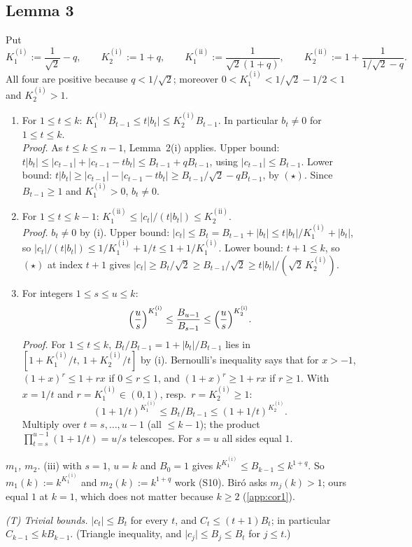 \documentclass[11pt]{amsart}
\theoremstyle{remark}
\theoremstyle{plain}
\newcommand{\abs}[1]{\lvert #1\rvert}
\newcommand{\Ka}{K_1^{(\mathrm{i})}}
\newcommand{\Kb}{K_2^{(\mathrm{i})}}
\newcommand{\Kc}{K_1^{(\mathrm{ii})}}
\newcommand{\Kd}{K_2^{(\mathrm{ii})}}
\begin{document}
\subsection{Lemma 3}\label{app:lemma3}
Put
\[
\Ka:=\frac1{\sqrt2}-q,\qquad \Kb:=1+q,\qquad \Kc:=\frac1{\sqrt2(1+q)},\qquad \Kd:=1+\frac1{1/\sqrt2-q}.
\]
All four are positive because $q<1/\sqrt2$; moreover $0<\Ka<1/\sqrt2-1/2<1$ and $\Kb>1$.

\begin{enumerate}[label=(\roman*),leftmargin=*]
\item For $1\le t\le k$: $\Ka B_{t-1}\le t\abs{b_t}\le\Kb B_{t-1}$. In particular $b_t\ne0$ for $1\le t\le k$. \\
\emph{Proof.} As $t\le k\le n-1$, Lemma~2(i) applies. Upper bound: $t\abs{b_t}\le\abs{c_{t-1}}+\abs{c_{t-1}-tb_t}\le B_{t-1}+qB_{t-1}$, using $\abs{c_{t-1}}\le B_{t-1}$. Lower bound: $t\abs{b_t}\ge\abs{c_{t-1}}-\abs{c_{t-1}-tb_t}\ge B_{t-1}/\sqrt2-qB_{t-1}$, by $(\star)$. Since $B_{t-1}\ge1$ and $\Ka>0$, $b_t\ne0$.
\item For $1\le t\le k-1$: $\Kc\le\abs{c_t}/(t\abs{b_t})\le\Kd$. \\
\emph{Proof.} $b_t\ne0$ by (i). Upper bound: $\abs{c_t}\le B_t=B_{t-1}+\abs{b_t}\le t\abs{b_t}/\Ka+\abs{b_t}$, so $\abs{c_t}/(t\abs{b_t})\le1/\Ka+1/t\le1+1/\Ka$. Lower bound: $t+1\le k$, so $(\star)$ at index $t+1$ gives $\abs{c_t}\ge B_t/\sqrt2\ge B_{t-1}/\sqrt2\ge t\abs{b_t}/(\sqrt2\,\Kb)$.
\item For integers $1\le s\le u\le k$:
\[
\Bigl(\frac us\Bigr)^{\Ka}\le\frac{B_{u-1}}{B_{s-1}}\le\Bigl(\frac us\Bigr)^{\Kb}.
\]
\emph{Proof.} For $1\le t\le k$, $B_t/B_{t-1}=1+\abs{b_t}/B_{t-1}$ lies in $[1+\Ka/t,\,1+\Kb/t]$ by (i). Bernoulli's inequality says that for $x>-1$, $(1+x)^r\le1+rx$ if $0\le r\le1$, and $(1+x)^r\ge1+rx$ if $r\ge1$. With $x=1/t$ and $r=\Ka\in(0,1)$, resp.\ $r=\Kb\ge1$:
\[
(1+1/t)^{\Ka}\le B_t/B_{t-1}\le(1+1/t)^{\Kb}.
\]
Multiply over $t=s,\dots,u-1$ (all $\le k-1$); the product $\prod_{t=s}^{u-1}(1+1/t)=u/s$ telescopes. For $s=u$ all sides equal $1$.
\end{enumerate}
\emph{$m_1$, $m_2$.} (iii) with $s=1$, $u=k$ and $B_0=1$ gives $k^{\Ka}\le B_{k-1}\le k^{1+q}$. So $m_1(k):=k^{\Ka}$ and $m_2(k):=k^{1+q}$ work (S10). Bir\'o asks $m_j(k)>1$; ours equal $1$ at $k=1$, which does not matter because $k\ge2$ (\ref{app:cor1}).

\emph{(T) Trivial bounds.} $\abs{c_t}\le B_t$ for every $t$, and $C_t\le(t+1)B_t$; in particular $C_{k-1}\le kB_{k-1}$. (Triangle inequality, and $\abs{c_j}\le B_j\le B_t$ for $j\le t$.)
\end{document}
